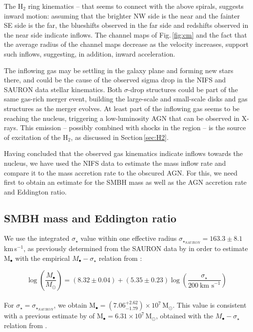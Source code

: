 \documentclass[fleqn,usenatbib]{mnras}
\begin{document}
The H$_2$ ring kinematics -- that seems to connect with the above spirals, suggests inward motion: assuming that the brighter NW side is the near and the fainter SE side is the far, the blueshifts observed in the far side and redshifts observed in the near side indicate inflows. The channel maps of Fig.\,\ref{fig:cm} and the fact that the average radius of the channel maps decrease as the velocity increases, support such inflows, %
suggesting, in addition, inward acceleration.

The inflowing gas may be settling in the galaxy plane and forming new stars there, and could be the cause of the observed sigma drop in the NIFS and SAURON data stellar kinematics. Both $\sigma$-drop structures could be part of the same gas-rich merger event, building the large-scale and small-scale disks and gas structures as the merger evolves. At least part of the inflowing gas seems to be reaching the nucleus, triggering a low-luminosity AGN that can be observed in X-rays. This emission -- possibly combined with shocks in the region -- is the source of excitation of the H$_2$, as discussed in Section\,\ref{sec:H2}.

Having concluded that the observed gas kinematics indicate inflows towards the nucleus, we have used the NIFS data to estimate the mass inflow rate and compare it to the mass accretion rate to the obscured AGN. For this, we need first to obtain an estimate for the SMBH mass as well as the AGN accretion rate and Eddington ratio.


\subsection{SMBH mass and Eddington ratio}

We use the integrated $\sigma_\star$ value within one effective radius $\sigma_{\star_{SAURON}} = 163.3 \pm 8.1$\,km\,s$^{-1}$, as previously determined from the SAURON data by \citet{cappellari_atlas3d_2013} in order to estimate M$_\bullet$ with the empirical $M_\bullet - \sigma_\star$ relation from \citet{van_den_bosch_unification_2016}:

\begin{equation}
    \log\left(\frac{M_\bullet}{M_\odot}\right) = (8.32 \pm 0.04) + (5.35 \pm 0.23)\log\left(\frac{\sigma_\star}{200\ \text{km s}^{-1}}\right)
\end{equation}
\\
\noindent For $\sigma_\star=\sigma_{\star_{SAURON}}$, we obtain M$_\bullet = (7.06^{+2.62}_{-1.79}) \times 10^7$\,M$_\odot$. This value is consistent with a previous estimate by \citet{nyland_atlas3d_2016} of M$_\bullet = 6.31 \times 10^7$\,M$_\odot$, obtained with the $M_\bullet - \sigma_\star$ relation from \citet{mcconnell_revisiting_2013}.
\end{document}
